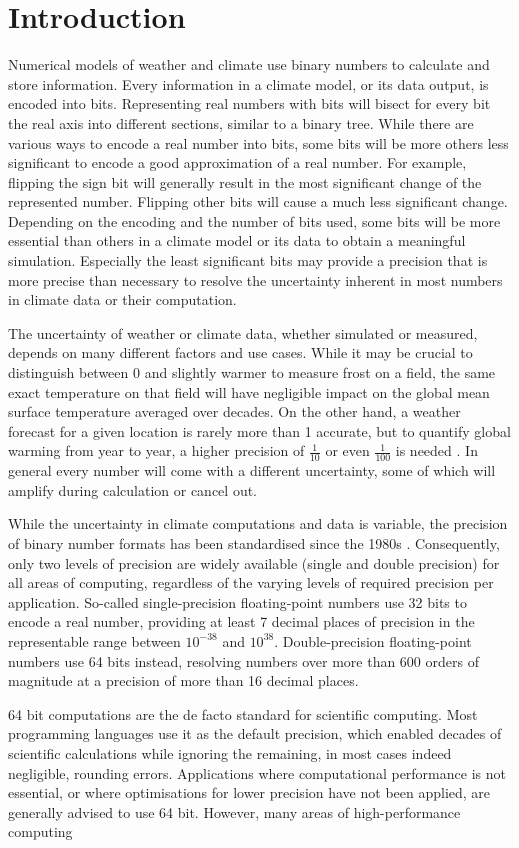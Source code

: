 \chapter{Introduction}
\label{chap:introduction}

Numerical models of weather and climate use binary numbers to calculate and store information.
Every information in a climate model, or its data output, is encoded into bits. Representing
real numbers with bits will bisect for every bit the real axis into different sections, similar to a binary tree.
While there are various ways to encode a real number into bits, some bits will be more others less
significant to encode a good approximation of a real number. For example, flipping the sign bit will
generally result in the most significant change of the represented number. Flipping other bits will
cause a much less significant change. Depending on the encoding and the number of bits used,
some bits will be more essential than others in a climate model or its data to obtain a meaningful
simulation. Especially the least significant bits may provide a precision that is more precise than
necessary to resolve the uncertainty inherent in most numbers in climate data or their computation.

The uncertainty of weather or climate data, whether simulated or measured, depends on many different
factors and use cases. While it may be crucial to distinguish between 0 and slightly warmer
to measure frost on a field, the same exact temperature on that field will have negligible impact on the
global mean surface temperature averaged over decades. On the other hand, a weather forecast for a
given location is rarely more than 1 accurate, but to quantify global warming from year to year,
a higher precision of $\tfrac{1}{10}$ or even $\tfrac{1}{100}$ is needed
\citep{Haustein2017}. In general every number will come with a different uncertainty, some of which will
amplify during calculation or cancel out.

While the uncertainty in climate computations and data is variable, the precision of binary number formats
has been standardised since the 1980s \citep{IEEE1985,IEEE2008}. Consequently, only two levels of precision
are widely available (single and double precision) for all areas of computing, regardless of the varying levels of
required precision per application. So-called single-precision floating-point numbers use 32 bits to encode a
real number, providing at least 7 decimal places of precision in the representable range between $10^{-38}$
and $10^{38}$. Double-precision floating-point numbers use 64 bits instead, resolving numbers over more
than 600 orders of magnitude at a precision of more than 16 decimal places. 

64 bit computations are the de facto standard for scientific computing. Most programming languages use
it as the default precision, which enabled decades of scientific calculations while ignoring the remaining,
in most cases indeed negligible, rounding errors. Applications where computational performance is not essential,
or where optimisations for lower precision have not been applied, are generally advised to use 64 bit.
However, many areas of high-performance computing 
